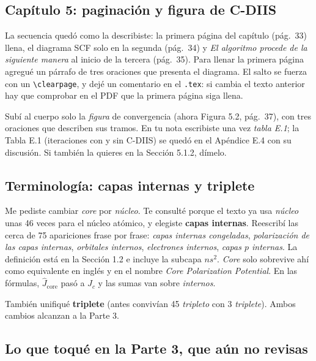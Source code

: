 \documentclass[11pt,a4paper]{article}
\newcommand{\arch}[1]{\texttt{\small #1}}
\begin{document}
\subsection{Capítulo 5: paginación y figura de C-DIIS}

La secuencia quedó como la describiste: la primera página del capítulo (pág.~33) llena, el
diagrama SCF solo en la segunda (pág.~34) y \emph{El algoritmo procede de la siguiente manera} al
inicio de la tercera (pág.~35). Para llenar la primera página agregué un párrafo de tres oraciones
que presenta el diagrama. El salto se fuerza con un \verb|\clearpage|, y dejé un comentario en el
\arch{.tex}: si cambia el texto anterior hay que comprobar en el PDF que la primera página siga
llena.

Subí al cuerpo solo la \emph{figura} de convergencia (ahora Figura 5.2, pág.~37), con tres
oraciones que describen sus tramos. En tu nota escribiste una vez \emph{tabla E.1}; la Tabla E.1
(iteraciones con y sin C-DIIS) se quedó en el Apéndice E.4 con su discusión. Si también la quieres
en la Sección 5.1.2, dímelo.

\subsection{Terminología: capas internas y triplete}

Me pediste cambiar \emph{core} por \emph{núcleo}. Te consulté porque el texto ya usa
\emph{núcleo} unas 46 veces para el núcleo atómico, y elegiste \textbf{capas internas}. Reescribí
las cerca de 75 apariciones frase por frase: \emph{capas internas congeladas}, \emph{polarización de las
capas internas}, \emph{orbitales internos}, \emph{electrones internos}, \emph{capas $p$ internas}.
La definición está en la Sección 1.2 e incluye la subcapa $ns^2$. \emph{Core} solo sobrevive ahí
como equivalente en inglés y en el nombre \emph{Core Polarization Potential}. En las fórmulas,
$\hat J_{\text{core}}$ pasó a $\hat J_c$ y las sumas van sobre \emph{internos}.

También unifiqué \textbf{triplete} (antes convivían 45 \emph{tripleto} con 3 \emph{triplete}).
Ambos cambios alcanzan a la Parte 3.

\subsection{Lo que toqué en la Parte 3, que aún no revisas}
\end{document}
